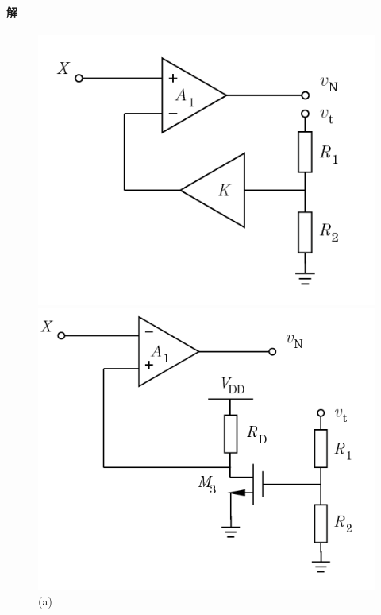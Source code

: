 \documentclass[hyperref, UTF8]{ctexart}
\begin{document}
\paragraph{解}
    \begin{figure}[!htb]
        \centering
        \begin{minipage}[t]{0.323\textwidth}
        \centering
        \includegraphics[width=1\textwidth]{p12-4-a.png}
        \caption*{(a)}
        \end{minipage}
        \begin{minipage}[t]{0.346\textwidth}
        \centering
        \includegraphics[width=1\textwidth]{p12-4-b.png}

\end{minipage}
\end{figure}
\end{document}
